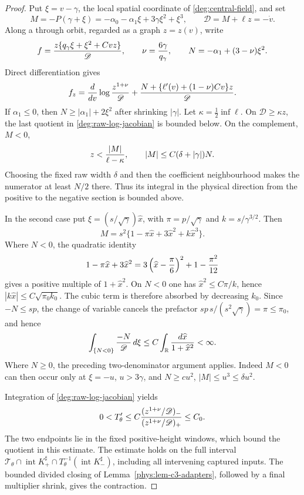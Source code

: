 \begin{proof}
Put \(\xi=v-\gamma\), the local spatial coordinate of
\eqref{deg:central-field}, and set
\[
 M=-P(\gamma+\xi)
 =-\alpha _0-\alpha _1\xi+3\gamma \xi^2+\xi^3,\qquad
 \mathscr D=M+\ell z=-\dot v.
\]
Along a through orbit, regarded as a graph \(z=z(v)\), write
\[
 f={z\{q_\gamma \xi+\xi^2+Cvz\}\over\mathscr D},\qquad
 \nu={6\gamma\over q_\gamma},\qquad
 N=-\alpha _1+(3-\nu)\xi^2.
\]
Direct differentiation gives
\begin{equation}
 f_z={d\over dv}\log {z^{1+\nu}\over\mathscr D}
       +{N+\{\ell'(v)+(1-\nu)Cv\}z\over\mathscr D}.
 \label{deg:raw-log-jacobian}
\end{equation}
If \(\alpha _1\le0\), then \(N\ge|\alpha _1|+2\xi^2\) after shrinking
\(|\gamma|\).  Let \(\kappa=\frac12\inf\ell\).  On
\(\mathscr D\ge\kappa z\), the last quotient in
\eqref{deg:raw-log-jacobian} is bounded below.  On the complement,
\(M<0\),
\[
 z<{|M|\over\ell-\kappa},\qquad
 |M|\le C(\delta+|\gamma|)N.
\]
Choosing the fixed raw width \(\delta\) and then the coefficient
neighbourhood makes the numerator at least \(N/2\) there.  Thus its
integral in the physical direction from the positive to the negative
section is bounded above.

In the second case put \(\xi=(s/\sqrt\gamma)\widehat x\), with
\(\pi=p/\sqrt\gamma\) and \(k=s/\gamma^{3/2}\).  Then
\[
 M=s^2\{1-\pi\widehat x+3\widehat x^2+k\widehat x^3\}.
\]
Where \(N<0\), the quadratic identity
\[
 1-\pi\widehat x+3\widehat x^2
 =3\left(\widehat x-{\pi\over6}\right)^2+1-{\pi^2\over12}
\]
gives a positive multiple of \(1+\widehat x^2\).  On \(N<0\) one has
\(\widehat x^2\le C\pi/k\), hence
\(|k\widehat x|\le C\sqrt{\pi_0k_0}\).
The cubic term is therefore absorbed by decreasing \(k_0\).
Since \(-N\le sp\), the change of variable cancels the prefactor
\(sp\,s/(s^2\sqrt\gamma)=\pi\le\pi_0\), and hence
\[
 \int_{\{N<0\}}{-N\over\mathscr D}\,d\xi
 \le C\int_{\mathbb R}{d\widehat x\over1+\widehat x^2}<\infty .
\]
Where \(N\ge0\), the preceding two-denominator argument applies.  Indeed
\(M<0\) can then occur only at \(\xi=-u\), \(u>3\gamma\), and
\(N\ge cu^2\), \(|M|\le u^3\le\delta u^2\).

Integration of \eqref{deg:raw-log-jacobian} yields
\[
 0<T_\theta'\le
 C{(z^{1+\nu}/\mathscr D)_-\over
       (z^{1+\nu}/\mathscr D)_+}\le C_0.
\]
The two endpoints lie in the fixed positive-height windows, which bound
the quotient in this estimate.
The estimate holds on the full interval
\(\mathcal T_\theta\cap\operatorname{int}K_+^\sharp
\cap T_\theta^{-1}(\operatorname{int}K_-^\sharp)\), including all
intervening captured inputs. The bounded divided closing of
Lemma~\ref{phys:lem-c3-adapters}, followed by a final multiplier
shrink, gives the contraction.
\end{proof}
